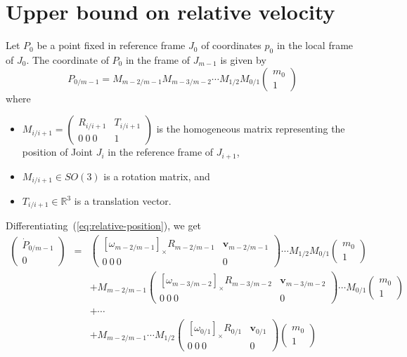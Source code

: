 \documentclass {article}
\newcommand\linvel{\textbf{v}}
\newcommand\reals{\mathbb{R}}
\newcommand\crossprod[1]{\left[#1\right]_{\times}}
\begin{document}
\section {Upper bound on relative velocity}

Let $P_0$ be a point fixed in reference frame $J_0$ of coordinates $p_0$ in the
local frame of $J_0$. The coordinate of $P_0$ in the frame of $J_{m-1}$ is given
by
\begin {equation}\label{eq:relative-position}
P_{0/m-1} = M_{m-2/m-1} M_{m-3/m-2}\cdots M_{1/2}M_{0/1}\left(\begin{array}{c}m_0\\1\end{array}\right)
\end {equation}
where \begin{itemize}
\item $M_{i/i+1} = \left(\begin{array}{cc}R_{i/i+1} & T_{i/i+1}\\ 0\ 0\ 0 & 1\end{array}\right)$ is the homogeneous matrix representing the position of Joint $J_i$ in the reference frame of $J_{i+1}$,
\item $M_{i/i+1}\in SO(3)$ is a rotation matrix, and
\item $T_{i/i+1}\in\reals^3$ is a translation vector.
\end{itemize}
Differentiating~(\ref{eq:relative-position}), we get
{\tiny
\begin {eqnarray}\label{eq:ineq-vel1}
\left(\begin{array}{c}\dot{P}_{0/m-1}\\0\end{array}\right) &=&\left(\begin{array}{cc}\crossprod{\omega_{m-2/m-1}} R_{m-2/m-1} & \linvel_{m-2/m-1} \\ 0 \ 0 \ 0 & 0\end{array}\right) \cdots M_{1/2} M_{0/1} \left(\begin{array}{c}m_0\\1\end{array}\right) \\
\label{eq:ineq-vel2}
&& + M_{m-2/m-1}\left(\begin{array}{cc}\crossprod{\omega_{m-3/m-2}} R_{m-3/m-2} & \linvel_{m-3/m-2} \\ 0 \ 0 \ 0 & 0\end{array}\right) \cdots M_{0/1}\left(\begin{array}{c}m_0\\1\end{array}\right) \\
\label{eq:ineq-vel3}
&& + \cdots \\
\label{eq:ineq-vel4}
&& + M_{m-2/m-1} \cdots M_{1/2}\left(\begin{array}{cc}\crossprod{\omega_{0/1}} R_{0/1} & \linvel_{0/1} \\ 0 \ 0 \ 0 & 0\end{array}\right)\left(\begin{array}{c}m_0\\1\end{array}\right)
\end {eqnarray}
}
\end{document}
